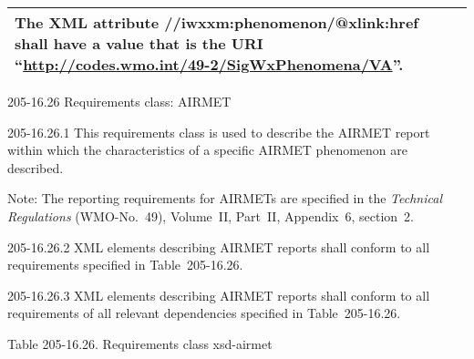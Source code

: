 \begin{longtable}[]{@{}ll@{}}
\begin{minipage}[t]{0.47\columnwidth}
The XML attribute //iwxxm:phenomenon/@xlink:href shall have a value that is the URI ``\url{http://codes.wmo.int/49-2/SigWxPhenomena/VA}''.\strut
\end{minipage}\tabularnewline
\bottomrule
\end{longtable}

205-16.26 Requirements class: AIRMET

205-16.26.1 This requirements class is used to describe the AIRMET report within which the characteristics of a specific AIRMET phenomenon are described.

Note: The reporting requirements for AIRMETs are specified in the \emph{Technical Regulations} (WMO-No.~49), Volume~II, Part~II, Appendix~6, section~2.

205-16.26.2 XML elements describing AIRMET reports shall conform to all requirements specified in Table~205-16.26.

205-16.26.3 XML elements describing AIRMET reports shall conform to all requirements of all relevant dependencies specified in Table~205-16.26.

Table 205-16.26. Requirements class xsd-airmet

